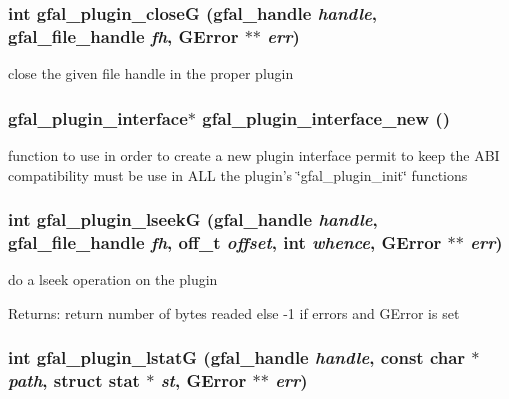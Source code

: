 \subsubsection{\setlength{\rightskip}{0pt plus 5cm}int gfal\_\-plugin\_\-close\-G (gfal\_\-handle {\em handle}, gfal\_\-file\_\-handle {\em fh}, GError $\ast$$\ast$ {\em err})}\label{gfal__common__plugin_8c_13d1db9798e5a830c745e2f909a484f4}


close the given file handle in the proper plugin 
\subsubsection{\setlength{\rightskip}{0pt plus 5cm}\bf{gfal\_\-plugin\_\-interface}$\ast$ gfal\_\-plugin\_\-interface\_\-new ()}\label{gfal__common__plugin_8c_6ecd3253665d357ecf47bad157e24e63}


function to use in order to create a new plugin interface permit to keep the ABI compatibility must be use in ALL the plugin's \char`\"{}gfal\_\-plugin\_\-init\char`\"{} functions 
\subsubsection{\setlength{\rightskip}{0pt plus 5cm}int gfal\_\-plugin\_\-lseek\-G (gfal\_\-handle {\em handle}, gfal\_\-file\_\-handle {\em fh}, off\_\-t {\em offset}, int {\em whence}, GError $\ast$$\ast$ {\em err})}\label{gfal__common__plugin_8c_c29b06ae43aa86049b513d1174393019}


do a lseek operation on the plugin \begin{Desc}
\item[Returns:]return number of bytes readed else -1 if errors and GError is set \end{Desc}
\subsubsection{\setlength{\rightskip}{0pt plus 5cm}int gfal\_\-plugin\_\-lstat\-G (gfal\_\-handle {\em handle}, const char $\ast$ {\em path}, struct stat $\ast$ {\em st}, GError $\ast$$\ast$ {\em err})}\label{gfal__common__plugin_8c_81a0d301234958fc59518fb6ce306425}


